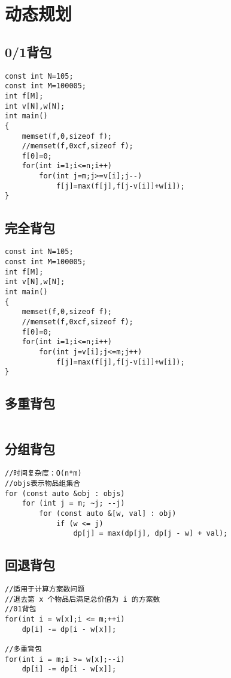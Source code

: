 \documentclass[twocolumn,a4]{article}
\begin{document}
\section{动态规划}
\subsection{0/1背包}
\begin{lstlisting}
const int N=105;
const int M=100005;
int f[M];
int v[N],w[N];
int main()
{
    memset(f,0,sizeof f);
    //memset(f,0xcf,sizeof f);
    f[0]=0;
    for(int i=1;i<=n;i++)
        for(int j=m;j>=v[i];j--)
            f[j]=max(f[j],f[j-v[i]]+w[i]);
}
\end{lstlisting}

\subsection{完全背包}
\begin{lstlisting}
const int N=105;
const int M=100005;
int f[M];
int v[N],w[N];
int main()
{
    memset(f,0,sizeof f);
    //memset(f,0xcf,sizeof f);
    f[0]=0;
    for(int i=1;i<=n;i++)
        for(int j=v[i];j<=m;j++)
            f[j]=max(f[j],f[j-v[i]]+w[i]);
}
\end{lstlisting}

\subsection{多重背包}
\begin{lstlisting}

\end{lstlisting}

\subsection{分组背包}
\begin{lstlisting}
//时间复杂度：O(n*m)
//objs表示物品组集合
for (const auto &obj : objs)
    for (int j = m; ~j; --j)
        for (const auto &[w, val] : obj)
            if (w <= j)
                dp[j] = max(dp[j], dp[j - w] + val);
\end{lstlisting}

\subsection{回退背包}
\begin{lstlisting}
//适用于计算方案数问题
//退去第 x 个物品后满足总价值为 i 的方案数
//01背包
for(int i = w[x];i <= m;++i)
    dp[i] -= dp[i - w[x]];

//多重背包
for(int i = m;i >= w[x];--i)
    dp[i] -= dp[i - w[x]];
\end{lstlisting}
\end{document}
